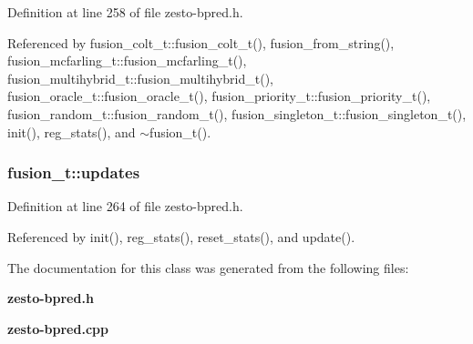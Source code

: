 Definition at line 258 of file zesto-bpred.h.

Referenced by fusion\_\-colt\_\-t::fusion\_\-colt\_\-t(), fusion\_\-from\_\-string(), fusion\_\-mcfarling\_\-t::fusion\_\-mcfarling\_\-t(), fusion\_\-multihybrid\_\-t::fusion\_\-multihybrid\_\-t(), fusion\_\-oracle\_\-t::fusion\_\-oracle\_\-t(), fusion\_\-priority\_\-t::fusion\_\-priority\_\-t(), fusion\_\-random\_\-t::fusion\_\-random\_\-t(), fusion\_\-singleton\_\-t::fusion\_\-singleton\_\-t(), init(), reg\_\-stats(), and $\sim$fusion\_\-t().
\subsubsection[{updates}]{ {\bf fusion\_\-t::updates}\hspace{0.3cm}{\tt  [protected]}}\label{classfusion__t_7788554edd47ba65da50c9def7cff27a}




Definition at line 264 of file zesto-bpred.h.

Referenced by init(), reg\_\-stats(), reset\_\-stats(), and update().

The documentation for this class was generated from the following files:\begin{CompactItemize}
\item 
{\bf zesto-bpred.h}\item 
{\bf zesto-bpred.cpp}\end{CompactItemize}
